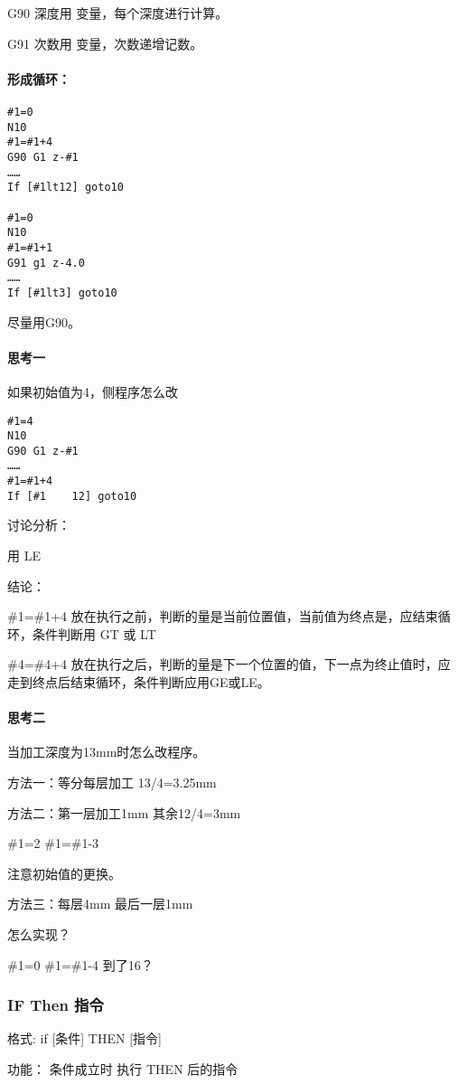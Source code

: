 G90 深度用 变量，每个深度进行计算。

G91 次数用 变量，次数递增记数。

\paragraph{形成循环：}
\begin{verbatim}
#1=0
N10 
#1=#1+4
G90 G1 z-#1
……
If [#1lt12] goto10

#1=0
N10
#1=#1+1
G91 g1 z-4.0
……
If [#1lt3] goto10
\end{verbatim}
尽量用G90。

\paragraph{思考一}
如果初始值为4，侧程序怎么改

\begin{verbatim}
#1=4
N10 
G90 G1 z-#1
……
#1=#1+4
If [#1    12] goto10
\end{verbatim}

讨论分析：

用  LE 
 
结论：

\#1=\#1+4 放在执行之前，判断的量是当前位置值，当前值为终点是，应结束循环，条件判断用 GT 或 LT

\#4=\#4+4 放在执行之后，判断的量是下一个位置的值，下一点为终止值时，应走到终点后结束循环，条件判断应用GE或LE。


\paragraph{思考二}

当加工深度为13mm时怎么改程序。

方法一：等分每层加工 13/4=3.25mm

方法二：第一层加工1mm 其余12/4=3mm

\#1=2    \#1=\#1-3

注意初始值的更换。

方法三：每层4mm 最后一层1mm

怎么实现？

\#1=0  \#1=\#1-4  到了16？

\subsubsection{IF  Then 指令}

格式:  if [条件] THEN [指令]

功能： 条件成立时 执行 THEN 后的指令

